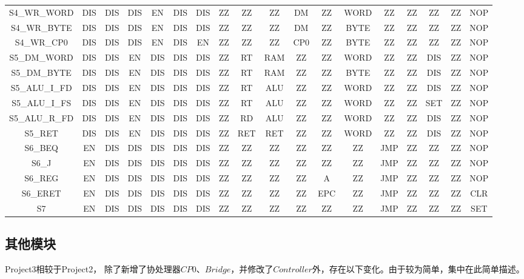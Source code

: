 \documentclass[main.tex]{subfiles}
\begin{document}
{\begin{tabular}[]{cccccccccccccccccc}
        S4\_WR\_WORD & DIS & DIS & DIS & EN & DIS & DIS & ZZ & ZZ & ZZ & DM & ZZ & WORD & ZZ & ZZ & ZZ & ZZ & NOP \\
        S4\_WR\_BYTE & DIS & DIS & DIS & EN & DIS & DIS & ZZ & ZZ & ZZ & DM & ZZ & BYTE & ZZ & ZZ & ZZ & ZZ & NOP \\
        S4\_WR\_CP0 & DIS & DIS & DIS & EN & DIS & EN & ZZ & ZZ & ZZ & CP0 & ZZ & BYTE & ZZ & ZZ & ZZ & ZZ & NOP \\
        S5\_DM\_WORD & DIS & DIS & EN & DIS & DIS & DIS & ZZ & RT & RAM & ZZ & ZZ & WORD & ZZ & ZZ & DIS & ZZ & NOP \\
        S5\_DM\_BYTE & DIS & DIS & EN & DIS & DIS & DIS & ZZ & RT & RAM & ZZ & ZZ & BYTE & ZZ & ZZ & DIS & ZZ & NOP \\
        S5\_ALU\_I\_FD & DIS & DIS & EN & DIS & DIS & DIS & ZZ & RT & ALU & ZZ & ZZ & WORD & ZZ & ZZ & DIS & ZZ & NOP \\
        S5\_ALU\_I\_FS & DIS & DIS & EN & DIS & DIS & DIS & ZZ & RT & ALU & ZZ & ZZ & WORD & ZZ & ZZ & SET & ZZ & NOP \\
        S5\_ALU\_R\_FD & DIS & DIS & EN & DIS & DIS & DIS & ZZ & RD & ALU & ZZ & ZZ & WORD & ZZ & ZZ & DIS & ZZ & NOP \\
        S5\_RET & DIS & DIS & EN & DIS & DIS & DIS & ZZ & RET & RET & ZZ & ZZ & WORD & ZZ & ZZ & DIS & ZZ & NOP \\
        S6\_BEQ & EN & DIS & DIS & DIS & DIS & DIS & ZZ & ZZ & ZZ & ZZ & ZZ & ZZ & JMP & ZZ & ZZ & ZZ & NOP \\
        S6\_J & EN & DIS & DIS & DIS & DIS & DIS & ZZ & ZZ & ZZ & ZZ & ZZ & ZZ & JMP & ZZ & ZZ & ZZ & NOP \\
        S6\_REG & EN & DIS & DIS & DIS & DIS & DIS & ZZ & ZZ & ZZ & ZZ & A & ZZ & JMP & ZZ & ZZ & ZZ & NOP \\
        S6\_ERET & EN & DIS & DIS & DIS & DIS & DIS & ZZ & ZZ & ZZ & ZZ & EPC & ZZ & JMP & ZZ & ZZ & ZZ & CLR \\
        S7 & EN & DIS & DIS & DIS & DIS & DIS & ZZ & ZZ & ZZ & ZZ & ZZ & ZZ & JMP & ZZ & ZZ & ZZ & SET \\
    \bottomrule
\end{tabular}
}%

\clearpage \subsection{其他模块}

Project3相较于Project2， 除了新增了协处理器$CP0$、$Bridge$，并修改了$Controller$外，存在以下变化。由于较为简单，集中在此简单描述。
\end{document}
